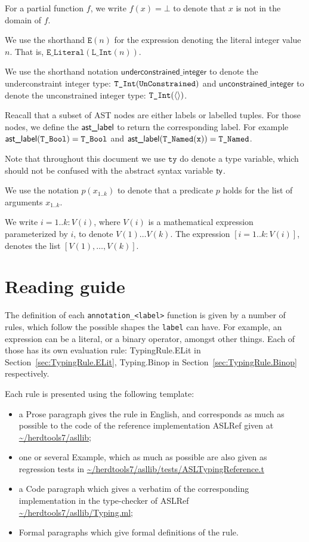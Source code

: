 \documentclass{book}
\newcommand\underconstrainedinteger[0]{\textsf{underconstrained\_integer}}
\newcommand\unconstrainedinteger[0]{\textsf{unconstrained\_integer}}
\newcommand\tty[0]{\texttt{ty}}
\begin{document}
For a partial function $f$, we write $f(x) = \bot$ to denote that $x$ is not in the domain of $f$.

\newcommand\Elit[1]{\texttt{E}(#1)}
We use the shorthand $\Elit{n}$ for the expression denoting the literal integer value $n$. That is, $\texttt{E\_Literal}(\texttt{L\_Int}(n))$.

We use the shorthand notation $\underconstrainedinteger$ to denote the underconstraint integer type: $\texttt{T\_Int}(\texttt{UnConstrained})$
and $\unconstrainedinteger$ to denote the unconstrained integer type: $\texttt{T\_Int}(\langle\rangle)$.

Reacall that a subset of AST nodes are either labels or labelled tuples.
For those nodes, we define the $\textsf{ast\_label}$ to return the corresponding label.
For example $\textsf{ast\_label}(\texttt{T\_Bool}) = \texttt{T\_Bool}$ and $\textsf{ast\_label}(\texttt{T\_Named}(\texttt{x})) = \texttt{T\_Named}$.

Note that throughout this document we use $\tty$ do denote a type variable, which should not be confused with the abstract syntax variable $\textsf{ty}$.

We use the notation $p(x_{1..k})$ to denote that a predicate $p$ holds for the list of arguments $x_{1..k}$.

We write $i=1..k: V(i)$, where $V(i)$ is a mathematical expression parameterized by $i$, to denote $V(1) \ldots V(k)$.
The expression $[i=1..k: V(i)]$, denotes the list $[V(1),\ldots,V(k)]$.

\chapter{Reading guide}

The definition of each \texttt{annotation\_<label>} function is given by a number of
rules, which follow the possible shapes the \texttt{label} can have. For
example, an expression can be a literal, or a binary operator, amongst other
things. Each of those has its own evaluation rule: TypingRule.ELit in
Section~\ref{sec:TypingRule.ELit}, Typing.Binop in
Section~\ref{sec:TypingRule.Binop} respectively.

Each rule is presented using the following template:
\begin{itemize}
\item a Prose paragraph gives the rule in English, and corresponds as much as possible to the code of the reference implementation ASLRef given at \url{~/herdtools7/asllib};
\item one or several Example, which as much as possible are also given as regression tests in \url{~/herdtools7/asllib/tests/ASLTypingReference.t}
\item a Code paragraph which gives a verbatim of the corresponding implementation in the type-checker of ASLRef \url{~/herdtools7/asllib/Typing.ml};
\item Formal paragraphs which give formal definitions of the rule.
\end{itemize}
\end{document}
